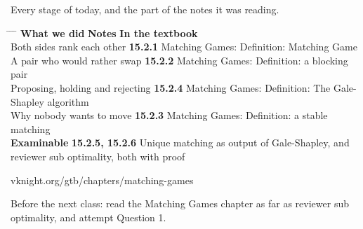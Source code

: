 \newpage
\nonotes
{}

\vspace{0.3cm}

{\large Every stage of today, and the part of the notes it was reading.}

\vspace{0.35cm}

\hspace{0.3cm}
\begin{minipage}{0.95\linewidth}
\begin{tabbing}
\hspace{6.9cm} \= \hspace{3.0cm} \= \hspace{9.4cm} \= \kill
\textbf{What we did} \> {\color{inkteal}\textbf{Notes}} \> \textbf{In the textbook} \>
  \\[0.5em]
Both sides rank each other \> {\color{inkteal}\textbf{15.2.1}} \> Matching Games:
  Definition: Matching Game \> \\[0.45em]
A pair who would rather swap \> {\color{inkteal}\textbf{15.2.2}} \> Matching Games:
  Definition: a blocking pair \> \\[0.45em]
Proposing, holding and rejecting \> {\color{inkteal}\textbf{15.2.4}} \> Matching
  Games: Definition: The Gale-Shapley algorithm \> \\[0.45em]
Why nobody wants to move \> {\color{inkteal}\textbf{15.2.3}} \> Matching Games:
  Definition: a stable matching \> \\[0.45em]
\textbf{Examinable} \> {\color{inkteal}\textbf{15.2.5, 15.2.6}} \> Unique matching as
  output of Gale-Shapley, and \> \\
\> \> reviewer sub optimality, both with proof \> 
\end{tabbing}
\end{minipage}

\vspace{0.45cm}

{\color{inkgrey} vknight.org/gtb/chapters/matching-games}

\vspace{0.3cm}

{\large Before the next class: read the Matching Games chapter as far as reviewer sub
  optimality, and attempt Question 1.}



